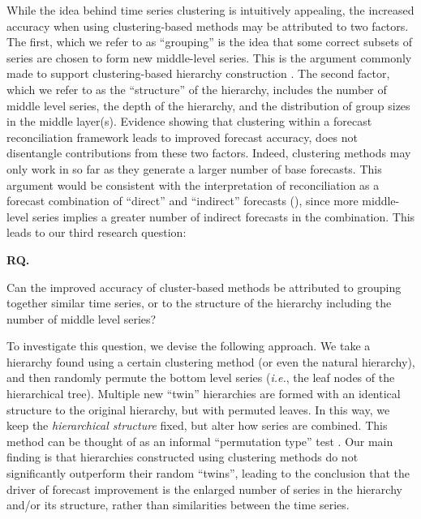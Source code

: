\documentclass[a4paper,review,12pt,authoryear]{elsarticle}
\newcounter{researchquestion}
\newenvironment{researchquestion}{%
    \refstepcounter{researchquestion}%
    \par\medskip\noindent%
    \textbf{RQ\theresearchquestion.}~%
}{\medskip}
\begin{document}
While the idea behind time series clustering is intuitively appealing, the increased accuracy when using clustering-based methods may be attributed to two factors. The first, which we refer to as     ``grouping'' is the idea that some correct subsets of series are chosen to form new middle-level series. This is the argument commonly made to support clustering-based hierarchy construction \citep[see e.g.][]{liForecastReconciliationApproach2019, pangHierarchicalElectricityTime2022, matteraImprovingOutofSampleForecasts2023}.  
The second factor, which we refer to as the ``structure'' of the hierarchy, includes the number of middle level series, the depth of the hierarchy, and the distribution of group sizes in the middle layer(s). Evidence showing that clustering within a forecast reconciliation framework leads to improved forecast accuracy, does not disentangle contributions from these two factors. Indeed, clustering methods may only work in so far as they generate a larger number of base forecasts. This argument would be consistent with the interpretation of reconciliation as a forecast combination of ``direct'' and ``indirect'' forecasts (\citealp{hollymanUnderstandingForecastReconciliation2021}), since more middle-level series implies a greater number of indirect forecasts in the combination. This leads to our third research question:

\begin{researchquestion}
    Can the improved accuracy of cluster-based methods be attributed to grouping together similar time series, or to the structure of the hierarchy including the number of middle level series?
\end{researchquestion}

To investigate this question, we devise the following approach. We take a hierarchy found using a certain clustering method (or even the natural hierarchy), and then randomly permute the bottom level series (\textit{i.e.}, the leaf nodes of the hierarchical tree). Multiple new ``twin'' hierarchies are formed with an identical structure to the original hierarchy, but with permuted leaves. In this way, we keep the \textit{hierarchical structure} fixed, but alter how series are combined. This method can be thought of as an informal ``permutation type'' test \citep{welch1990}. Our main finding is that hierarchies constructed using clustering methods do not significantly outperform their random ``twins'', leading to the conclusion that the driver of forecast improvement is the enlarged number of series in the hierarchy and/or its structure, rather than similarities between the time series. 
\end{document}
